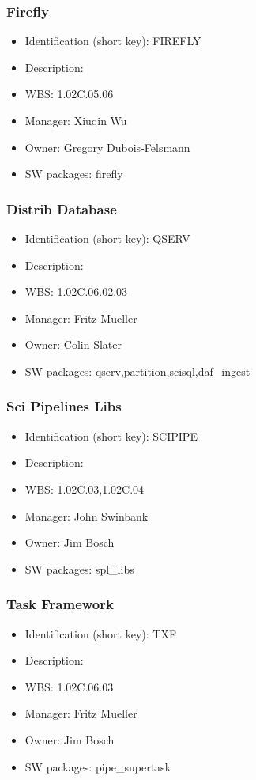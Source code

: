 \subsubsection{Firefly}\label{sect:FIREFLY}
\begin{itemize}
\item Identification (short key): FIREFLY
\item Description: 
\item WBS: 1.02C.05.06
\item Manager: Xiuqin Wu
\item Owner: Gregory Dubois-Felsmann
\item SW packages: firefly
\end{itemize}

\subsubsection{Distrib Database}\label{sect:QSERV}
\begin{itemize}
\item Identification (short key): QSERV
\item Description: 
\item WBS: 1.02C.06.02.03
\item Manager: Fritz Mueller
\item Owner: Colin Slater
\item SW packages: qserv,partition,scisql,daf\_ingest
\end{itemize}

\subsubsection{Sci Pipelines Libs}\label{sect:SCIPIPE}
\begin{itemize}
\item Identification (short key): SCIPIPE
\item Description: 
\item WBS: 1.02C.03,1.02C.04
\item Manager: John Swinbank
\item Owner: Jim Bosch
\item SW packages: spl\_libs
\end{itemize}

\subsubsection{Task Framework}\label{sect:TXF}
\begin{itemize}
\item Identification (short key): TXF
\item Description: 
\item WBS: 1.02C.06.03
\item Manager: Fritz Mueller
\item Owner: Jim Bosch
\item SW packages: pipe\_supertask
\end{itemize}

